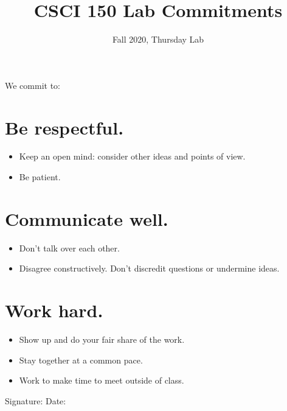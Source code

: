 \documentclass{tufte-handout}
\title{CSCI 150 Lab Commitments}
\date{Fall 2020, Thursday Lab}
\begin{document}
\maketitle

We commit to:

\section{Be respectful.}

\begin{itemize}
\item Keep an open mind: consider other ideas and points of view.
\item Be patient.
\end{itemize}

\section{Communicate well.}

\begin{itemize}
\item Don't talk over each other.
\item Disagree constructively.  Don't discredit questions or undermine
  ideas.
\end{itemize}

\section{Work hard.}

\begin{itemize}
\item Show up and do your fair share of the work.
\item Stay together at a common pace.
\item Work to make time to meet outside of class.
\end{itemize}

\vspace{1in}

\begin{figure*}
\noindent Signature:
\underline{\phantom{XXXXXXXXXXXXXXXXXXXXXXXXXXXX}} \hfill  Date:
\underline{\phantom{XXXXXXXXXXXXXXXXXXXXXX}}
\end{figure*}
\end{document}

